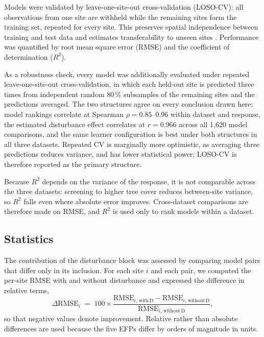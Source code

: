 \documentclass[pdflatex,sn-nature]{sn-jnl}%
\theoremstyle{thmstyleone}%
\theoremstyle{thmstyletwo}%
\theoremstyle{thmstylethree}%
\begin{document}
Models were validated by leave-one-site-out cross-validation (LOSO-CV): all observations from one site are withheld while the remaining sites form the training set, repeated for every site. This preserves spatial independence between training and test data and estimates transferability to unseen sites \cite{roberts2017cross}. Performance was quantified by root mean square error (RMSE) and the coefficient of determination ($R^2$).

As a robustness check, every model was additionally evaluated under repeated leave-one-site-out cross-validation, in which each held-out site is predicted three times from independent random 80\,\% subsamples of the remaining sites and the predictions averaged. The two structures agree on every conclusion drawn here: model rankings correlate at Spearman $\rho = 0.85$--0.96 within dataset and response, the estimated disturbance effect correlates at $r = 0.966$ across all 1{,}620 model comparisons, and the same learner configuration is best under both structures in all three datasets. Repeated CV is marginally more optimistic, as averaging three predictions reduces variance, and has lower statistical power; LOSO-CV is therefore reported as the primary structure.

Because $R^2$ depends on the variance of the response, it is not comparable across the three datasets: screening to higher tree cover reduces between-site variance, so $R^2$ falls even where absolute error improves. Cross-dataset comparisons are therefore made on RMSE, and $R^2$ is used only to rank models within a dataset.

\subsection*{Statistics}

The contribution of the disturbance block was assessed by comparing model pairs that differ only in its inclusion. For each site $i$ and each pair, we computed the per-site RMSE with and without disturbance and expressed the difference in relative terms,
\begin{equation}
\Delta\mathrm{RMSE}_i \;=\; 100 \times \frac{\mathrm{RMSE}_{i,\,\mathrm{with\,D}} - \mathrm{RMSE}_{i,\,\mathrm{without\,D}}}{\mathrm{RMSE}_{i,\,\mathrm{without\,D}}},
\end{equation}
so that negative values denote improvement. Relative rather than absolute differences are used because the five EFPs differ by orders of magnitude in units.
\end{document}
